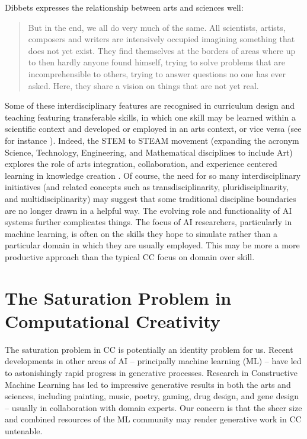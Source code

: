 \documentclass[letterpaper]{article}
\begin{document}
Dibbets expresses the relationship between arts and sciences well:
\begin{quote}
  But in the end, we all do very much of the same. All scientists,
  artists, composers and writers are intensively occupied imagining
  something that does not yet exist. They find themselves at the
  borders of areas where up to then hardly anyone found himself,
  trying to solve problems that are incomprehensible to others, trying
  to answer questions no one has ever asked. Here, they share a vision
  on things that are not yet real. \cite[p. 1]{dibbets}
\end{quote}
Some of these interdisciplinary features are recognised in curriculum
design and teaching featuring transferable skills, in which one skill
may be learned within a scientific context and developed or employed
in an arts context, or vice versa (see for instance \cite{gaff}).
Indeed, the STEM to STEAM movement (expanding the acronym Science,
Technology, Engineering, and Mathematical disciplines to include Art)
explores the role of arts integration, collaboration, and experience
centered learning in knowledge creation \cite{ghanbari}. Of course,
the need for so many interdisciplinary initiatives (and related
concepts such as transdisciplinarity, pluridisciplinarity, and
multidisciplinarity) may suggest that some traditional discipline
boundaries are no longer drawn in a helpful way. The evolving role and
functionality of AI systems further complicates things. The focus of
AI researchers, particularly in machine learning, is often on the
skills they hope to simulate rather than a particular domain in which
they are usually employed. This may be more a more productive approach
than the typical CC focus on domain over skill.






\section{The Saturation Problem in Computational Creativity}

The saturation problem in CC is potentially an identity problem for
us. Recent developments in other areas of AI -- principally machine
learning (ML) -- have led to astonishingly rapid progress in
generative processes.  Research in Constructive Machine Learning has
led to impressive generative results in both the arts and sciences,
including painting, music, poetry, gaming, drug design, and gene
design -- usually in collaboration with domain experts. Our concern is
that the sheer size and combined resources of the ML community may
render generative work in CC untenable.
\end{document}
